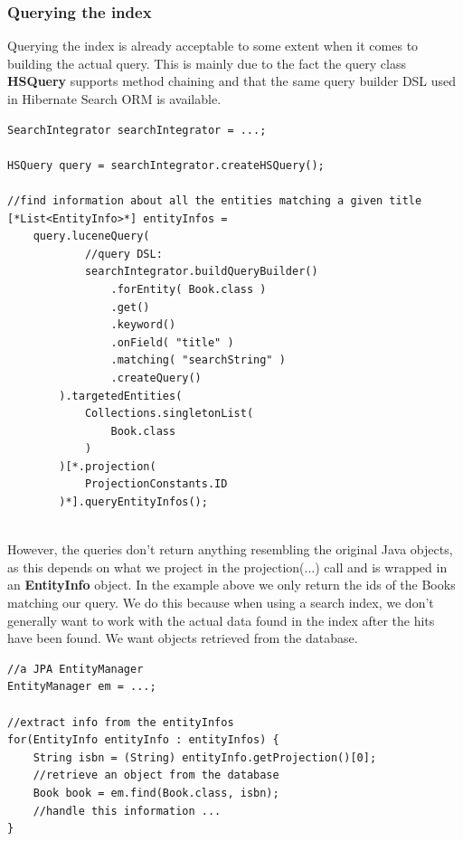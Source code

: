 \subsubsection{Querying the index}
Querying the index is already acceptable to some extent when it comes to building the actual query. This is mainly due to the fact the query class \textbf{HSQuery} supports method chaining and that the same query builder DSL used in Hibernate Search ORM is available.
\\
\lstset{language=java}
\begin{lstlisting}[frame=htrbl, caption={Querying the index with the engine}, label={lst:querying_natively.java}]
SearchIntegrator searchIntegrator = ...;

HSQuery query = searchIntegrator.createHSQuery();

//find information about all the entities matching a given title
[*List<EntityInfo>*] entityInfos = 
	query.luceneQuery(
			//query DSL:
			searchIntegrator.buildQueryBuilder()
				.forEntity( Book.class )
				.get()
				.keyword()
				.onField( "title" )
				.matching( "searchString" )
				.createQuery()
		).targetedEntities(
			Collections.singletonList(
				Book.class
			)
		)[*.projection(
			ProjectionConstants.ID
		)*].queryEntityInfos();
\end{lstlisting}
~\\
However, the queries don't return anything resembling the original Java objects, as this depends on what we project in the projection(...) call and is wrapped in an \textbf{EntityInfo} object. In the example above we only return the ids of the Books matching our query. We do this because when using a search index, we don't generally want to work with the actual data found in the index after the hits have been found. We want objects retrieved from the database.
\\
\lstset{language=java}
\begin{lstlisting}[frame=htrbl, caption={Extracting info from the results}, label={lst:querying_natively.java_2}]
//a JPA EntityManager
EntityManager em = ...;

//extract info from the entityInfos
for(EntityInfo entityInfo : entityInfos) {
	String isbn = (String) entityInfo.getProjection()[0];
	//retrieve an object from the database
	Book book = em.find(Book.class, isbn);
	//handle this information ...
}
\end{lstlisting}

\pagebreak

